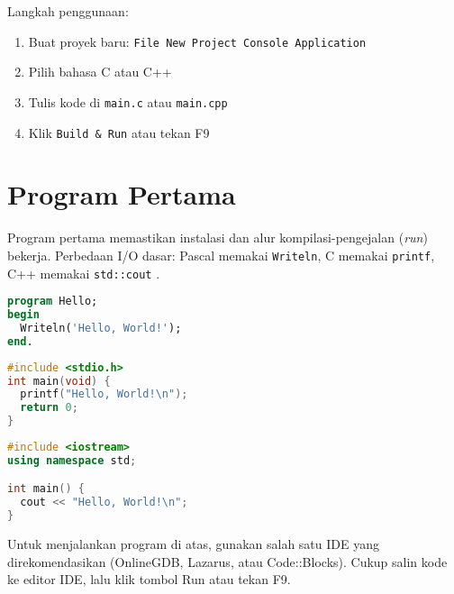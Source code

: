 \documentclass[../main.tex]{subfiles}
\begin{document}
Langkah penggunaan:
\begin{enumerate}
  \item Buat proyek baru: \texttt{File \textrightarrow{} New \textrightarrow{} Project \textrightarrow{} Console Application}
  \item Pilih bahasa C atau C++
  \item Tulis kode di \texttt{main.c} atau \texttt{main.cpp}
  \item Klik \texttt{Build \& Run} atau tekan F9
\end{enumerate}

\section{Program Pertama}
Program pertama memastikan instalasi dan alur kompilasi-pengejalan (\emph{run}) bekerja. Perbedaan I/O dasar: Pascal memakai \texttt{Writeln}, C memakai \texttt{printf}, C++ memakai \texttt{std::cout} \parencite{w3pascal-io,gnu-c-manual,cpp-reference}.

\begin{lstlisting}[language=Pascal, caption={Hello World pada Pascal}]
program Hello;
begin
  Writeln('Hello, World!');
end.
\end{lstlisting}

\begin{lstlisting}[language=C, caption={Hello World pada C}]
#include <stdio.h>
int main(void) {
  printf("Hello, World!\n");
  return 0;
}
\end{lstlisting}

\begin{lstlisting}[language=C++, caption={Hello World pada C++}]
#include <iostream>
using namespace std;

int main() {
  cout << "Hello, World!\n";
}
\end{lstlisting}

Untuk menjalankan program di atas, gunakan salah satu IDE yang direkomendasikan (OnlineGDB, Lazarus, atau Code::Blocks). Cukup salin kode ke editor IDE, lalu klik tombol Run atau tekan F9.
\end{document}
